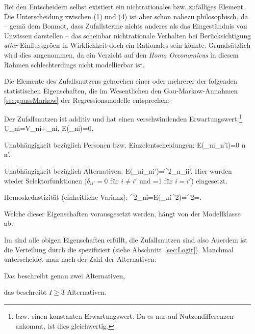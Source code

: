 \item[(4)] Bei den Entscheidern selbst existiert ein nichtrationales
bzw. zuf\"alliges Element. Die Unterscheidung zwischen (1) und (4) ist
aber schon nahezu philosophisch, da -- gem\"a\3 dem Bonmot, dass
Zufallsterme nichts anderes als das Eingest\"andnis von Unwissen darstellen
-- das scheinbar nichtrationale Verhalten bei Ber\"ucksichtigung \textit{aller}
Einflussgr\"o\3en in Wirklichkeit doch ein Rationales sein k\"onnte. Grunds\"atzlich
wird dies angenommen, da ein Verzicht auf den \textit{Homo
Oeconomicus} in diesem Rahmen schlechterdings nicht modellierbar ist.
\ei

\noindent
Die Elemente des
Zufallsnutzens gehorchen einer oder mehrerer der folgenden statistischen
Eigenschaften, die 
im Wesentlichen den Gau\3-Markow-Annahmen \ref{sec:gaussMarkow} der Regressionsmodelle
entsprechen:

\benum
\item Der Zufallsnutzen ist additiv und hat einen verschwindenden
Erwartungswert:\footnote{bzw. einen konstanten Erwartungswert. Da es
  nur auf Nutzendifferenzen ankommt, ist dies gleich\-wertig.}
\be
\label{gaussMarkowDiscri}
U_{ni}=V_{ni}+\epsilon_{ni}, \quad E(\epsilon_{ni})=0.
\ee

\item Unabh\"angigkeit bez\"uglich Personen bzw. Einzelentscheidungen:
\be
\label{gaussMarkowDiscriiPers}
E\left(\epsilon_{ni}\epsilon_{n'i}\right)=0 \quad {} \quad
n \neq n'.
\ee

\item Unabh\"angigkeit bez\"uglich Alternativen:
\be
\label{gaussMarkowDiscriiAlt}
E\left(\epsilon_{ni}\epsilon_{ni'}\right)=\sigma^2_{n}\delta_{ii'}.
\ee
Hier wurden wieder Selektorfunktionen ($\delta_{ii'}=0$ f\"ur $i
\neq i'$ und =1 f\"ur $i=i'$) eingesetzt.

\item Homoskedastizit\"at (einheitliche Varianz):
\be
\label{gaussMarkowDiscriii}
\sigma^2_{ni}=E(\epsilon_{ni}^2)=\sigeps^2=.
\ee
\eenum


\noindent
Welche dieser Eigenschaften
vorausgesetzt werden, h\"angt von der Modellklasse ab:

\bi
\item Im  sind alle obigen Eigenschaften
  erf\"ullt, die Zufallsnutzen sind also  Au\3erdem ist die
  Verteilung durch die   spezifiziert
  (siehe 
  Abschnitt~\ref{sec:Logit}). Manchmal unterscheidet man nach der Zahl der Alternativen:
 \bi
   \item Das  beschreibt genau zwei
   Alternativen,
   \item  das   beschreibt $I\ge 3$ Alternativen.
 \ei

